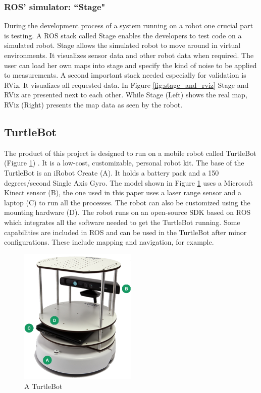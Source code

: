 \documentclass{ba-kecs}
\begin{document}
\subsubsection{ROS' simulator: ``Stage"}
During the development process of a system running on a robot one crucial part is testing. A ROS stack called Stage enables the developers to test code on a simulated robot. Stage allows the simulated robot to move around in virtual environments. It visualizes sensor data and other robot data when required. The user can load her own maps into stage and specify the kind of noise to be applied to measurements. A second important stack needed especially for validation is RViz. It visualizes all requested data. In Figure \ref{fig:stage_and_rviz} Stage and RViz are presented next to each other. While Stage (Left) shows the real map, RViz (Right) presents the map data as seen by the robot.

\subsection{TurtleBot}
\label{subsec:turtle}
The product of this project is designed to run on a mobile robot called TurtleBot (Figure \ref{fig:turtlebot}) \citep{turtlebot}. It is a low-cost, customizable, personal robot kit. The base of the TurtleBot is an iRobot Create (A). It holds a battery pack and a 150 degrees/second Single Axis Gyro. The model shown in Figure \ref{fig:turtlebot} uses a Microsoft Kinect sensor (B), the one used in this paper uses a laser range sensor and a laptop (C) to run all the processes. The robot can also be customized using the mounting hardware (D). The robot runs on an open-source SDK based on ROS which integrates all the software needed to get the TurtleBot running. Some capabilities are included in ROS and can be used in the TurtleBot after minor configurations. These include mapping and navigation, for example. 
\begin{figure}[h]
	\centering
		\includegraphics[width=0.50\textwidth]{figures/turtlebot.png}
	\caption{A TurtleBot}
	\label{fig:turtlebot}
\end{figure}
\end{document}
